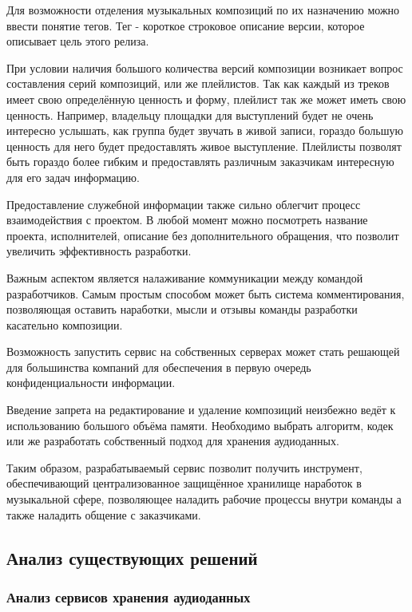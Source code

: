 \documentclass[14pt]{extarticle}
\begin{document}
Для возможности отделения музыкальных композиций по их назначению можно ввести понятие тегов. Тег - короткое 
строковое описание версии, которое описывает цель этого релиза.

При условии наличия большого количества версий композиции возникает вопрос составления серий композиций, или же плейлистов. 
Так как каждый из треков имеет свою определённую ценность и форму, плейлист так же может иметь свою ценность. 
Например, владельцу площадки для выступлений будет не очень интересно услышать, как группа будет звучать в живой записи, гораздо большую ценность
для него будет предоставлять живое выступление. Плейлисты позволят быть гораздо более гибким и предоставлять
различным заказчикам интересную для его задач информацию.

Предоставление служебной информации также сильно облегчит процесс взаимодействия с проектом. 
В любой момент можно посмотреть название проекта, исполнителей, описание без дополнительного обращения, что 
позволит увеличить эффективность разработки. 

Важным аспектом является налаживание коммуникации между командой разработчиков. Самым простым способом
может быть система комментирования, позволяющая оставить наработки, мысли и отзывы команды разработки касательно 
композиции.

Возможность запустить сервис на собственных серверах может стать решающей для большинства компаний для 
обеспечения в первую очередь конфиденциальности информации.

Введение запрета на редактирование и удаление композиций неизбежно ведёт к использованию большого объёма памяти. 
Необходимо выбрать алгоритм, кодек или же разработать собственный подход для хранения аудиоданных.

Таким образом, разрабатываемый сервис позволит получить инструмент, обеспечивающий централизованное
защищённое хранилище наработок в музыкальной сфере, позволяющее наладить рабочие процессы внутри команды а также
наладить общение с заказчиками.

\subsection{Анализ существующих решений}

\subsubsection{Анализ сервисов хранения аудиоданных}
\end{document}
